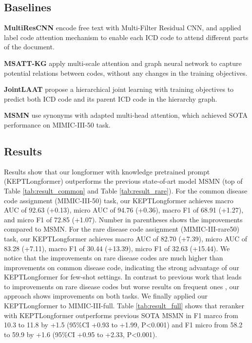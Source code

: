 \documentclass[11pt]{article}
\begin{document}
\subsection{Baselines}
\noindent \textbf{MultiResCNN} \citep{Li2020ICDCF}
encode free text with Multi-Filter Residual CNN, and applied label code attention mechanism to enable each ICD code to attend different parts of the document.

\noindent \textbf{MSATT-KG} \citep{Xie2019EHRCW}
apply multi-scale attention and graph neural network to capture potential relations between codes, without any changes in the training objectives.

\noindent \textbf{JointLAAT} \citep{Vu2020ALA}
propose a hierarchical joint learning with training objectives to predict both ICD code and its parent ICD code in the hierarchy graph.

\noindent \textbf{MSMN} \citep{Yuan2022CodeSD}
use synonyms with adapted multi-head attention, which achieved SOTA performance on MIMIC-III-50 task.



\subsection{Results}
Results show that our longformer with knowledge pretrained prompt (KEPTLongformer) outperforms the previous state-of-art model MSMN (top of Table \ref{tab:result_common} and Table \ref{tab:result_rare}).
For the common disease code assignment (MIMIC-III-50) task,
our KEPTLongformer achieves macro AUC of 92.63 (+0.13), micro AUC of 94.76 (+0.36), macro F1 of 68.91 (+1.27), and micro F1 of 72.85 (+1.07). Number in parentheses shows the improvements compared to MSMN. For the rare disease code assignment (MIMIC-III-rare50) task,
our KEPTLongformer achieves macro AUC of 82.70 (+7.39), micro AUC of 83.28 (+7.11), macro F1 of 30.44 (+13.39), micro F1 of 32.63 (+15.44). 
We notice that the improvements on rare disease codes are much higher than improvements on common disease code, indicating the strong advantage of our KEPTLongformer for few-shot settings. In contrast to previous work that leads to improvements on rare disease codes but worse results on frequent ones \citep{rios-kavuluru-2018-shot}, our approach shows improvements on both tasks. We finally applied our KEPTLongformer to MIMIC-III-full.
Table \ref{tab:result_full} shows that reranker with KEPTLongformer outperforms previous SOTA MSMN in F1 marco from 10.3 to 11.8 by +1.5 (95\%CI +0.93 to +1.99, P<0.001) and F1 micro from 58.2 to 59.9 by +1.6 (95\%CI +0.95 to +2.33, P<0.001). 
\end{document}
